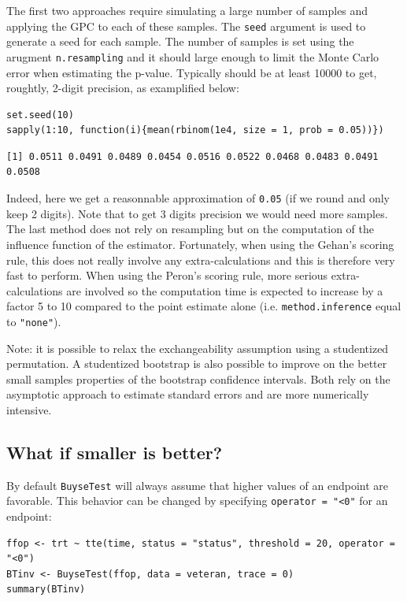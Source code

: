 \documentclass[12pt]{article}
\begin{document}
The first two approaches require simulating a large number of samples
and applying the GPC to each of these samples. The \texttt{seed} argument is
used to generate a seed for each sample. The number of samples is set
using the arugment \texttt{n.resampling} and it should large enough to limit
the Monte Carlo error when estimating the p-value. Typically should be
at least 10000 to get, roughtly, 2-digit precision, as examplified
below:
\lstset{language=r,label= ,caption= ,captionpos=b,numbers=none}
\begin{lstlisting}
set.seed(10)
sapply(1:10, function(i){mean(rbinom(1e4, size = 1, prob = 0.05))})
\end{lstlisting}

\begin{verbatim}
[1] 0.0511 0.0491 0.0489 0.0454 0.0516 0.0522 0.0468 0.0483 0.0491 0.0508
\end{verbatim}

Indeed, here we get a reasonnable approximation of \texttt{0.05} (if we round
and only keep 2 digits). Note that to get 3 digits precision we would
need more samples. The last method does not rely on resampling but on
the computation of the influence function of the
estimator. Fortunately, when using the Gehan's scoring rule, this does
not really involve any extra-calculations and this is therefore very
fast to perform. When using the Peron's scoring rule, more serious
extra-calculations are involved so the computation time is expected to
increase by a factor 5 to 10 compared to the point estimate alone
(i.e. \texttt{method.inference} equal to \texttt{"none"}).

\bigskip

Note: it is possible to relax the exchangeability assumption using a
studentized permutation. A studentized bootstrap is also possible to
improve on the better small samples properties of the bootstrap
confidence intervals. Both rely on the asymptotic approach to estimate
standard errors and are more numerically intensive.

\clearpage

\subsection{What if smaller is better?}
\label{sec:org512dff2}
By default \texttt{BuyseTest} will always assume that higher values of an
endpoint are favorable. This behavior can be changed by specifying \texttt{operator = "<0"}
for an endpoint:
\lstset{language=r,label= ,caption= ,captionpos=b,numbers=none}
\begin{lstlisting}
ffop <- trt ~ tte(time, status = "status", threshold = 20, operator = "<0")
BTinv <- BuyseTest(ffop, data = veteran, trace = 0)
summary(BTinv)
\end{lstlisting}
\end{document}
